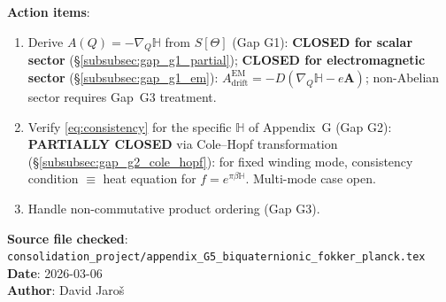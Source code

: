 \documentclass[12pt]{article}
\theoremstyle{definition}
\theoremstyle{remark}
\begin{document}
\textbf{Action items}:
\begin{enumerate}
  \item Derive $A(Q) = -\nabla_Q\mathbb{H}$ from $S[\Theta]$ (Gap G1):
        \textbf{CLOSED for scalar sector} (§\ref{subsubsec:gap_g1_partial});
        \textbf{CLOSED for electromagnetic sector}
        (§\ref{subsubsec:gap_g1_em}):
        $A_{\mathrm{drift}}^{\mathrm{EM}} = -D(\nabla_Q\mathbb{H} - e\mathbf{A})$;
        non-Abelian sector requires Gap~G3 treatment.
  \item Verify \eqref{eq:consistency} for the specific $\mathbb{H}$ of Appendix~G (Gap G2):
        \textbf{PARTIALLY CLOSED} via Cole--Hopf transformation
        (§\ref{subsubsec:gap_g2_cole_hopf}): for fixed winding mode,
        consistency condition $\equiv$ heat equation for $f = e^{\pi\beta\mathbb{H}}$.
        Multi-mode case open.
  \item Handle non-commutative product ordering (Gap G3).
\end{enumerate}

\noindent\textbf{Source file checked}: \texttt{consolidation\_project/appendix\_G5\_biquaternionic\_fokker\_planck.tex}\\
\textbf{Date}: 2026-03-06\\
\textbf{Author}: David Jaroš

\ifdefined\INCLUDEMODE
\else
\end{document}
